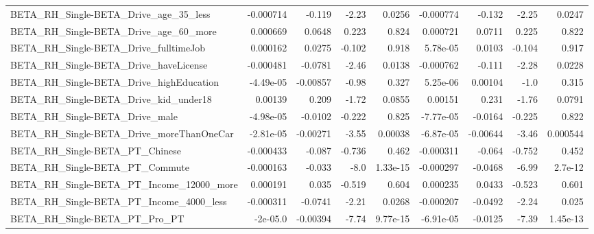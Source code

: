 \begin{tabular}{lrrrrrrrr}
BETA\_RH\_Single-BETA\_Drive\_age\_35\_less              &   -0.000714 &       -0.119 &     -2.23 &   0.0256 &  -0.000774 &      -0.132 &        -2.25 &        0.0247 \\
BETA\_RH\_Single-BETA\_Drive\_age\_60\_more              &    0.000669 &       0.0648 &     0.223 &    0.824 &   0.000721 &      0.0711 &        0.225 &         0.822 \\
BETA\_RH\_Single-BETA\_Drive\_fulltimeJob              &    0.000162 &       0.0275 &    -0.102 &    0.918 &   5.78e-05 &      0.0103 &       -0.104 &         0.917 \\
BETA\_RH\_Single-BETA\_Drive\_haveLicense              &   -0.000481 &      -0.0781 &     -2.46 &   0.0138 &  -0.000762 &      -0.111 &        -2.28 &        0.0228 \\
BETA\_RH\_Single-BETA\_Drive\_highEducation            &   -4.49e-05 &     -0.00857 &     -0.98 &    0.327 &   5.25e-06 &     0.00104 &         -1.0 &         0.315 \\
BETA\_RH\_Single-BETA\_Drive\_kid\_under18              &     0.00139 &        0.209 &     -1.72 &   0.0855 &    0.00151 &       0.231 &        -1.76 &        0.0791 \\
BETA\_RH\_Single-BETA\_Drive\_male                     &   -4.98e-05 &      -0.0102 &    -0.222 &    0.825 &  -7.77e-05 &     -0.0164 &       -0.225 &         0.822 \\
BETA\_RH\_Single-BETA\_Drive\_moreThanOneCar           &   -2.81e-05 &     -0.00271 &     -3.55 &  0.00038 &  -6.87e-05 &    -0.00644 &        -3.46 &      0.000544 \\
BETA\_RH\_Single-BETA\_PT\_Chinese                     &   -0.000433 &       -0.087 &    -0.736 &    0.462 &  -0.000311 &      -0.064 &       -0.752 &         0.452 \\
BETA\_RH\_Single-BETA\_PT\_Commute                     &   -0.000163 &       -0.033 &      -8.0 & 1.33e-15 &  -0.000297 &     -0.0468 &        -6.99 &       2.7e-12 \\
BETA\_RH\_Single-BETA\_PT\_Income\_12000\_more           &    0.000191 &        0.035 &    -0.519 &    0.604 &   0.000235 &      0.0433 &       -0.523 &         0.601 \\
BETA\_RH\_Single-BETA\_PT\_Income\_4000\_less            &   -0.000311 &      -0.0741 &     -2.21 &   0.0268 &  -0.000207 &     -0.0492 &        -2.24 &         0.025 \\
BETA\_RH\_Single-BETA\_PT\_Pro\_PT                      &    -2e-05.0 &     -0.00394 &     -7.74 & 9.77e-15 &  -6.91e-05 &     -0.0125 &        -7.39 &      1.45e-13 \\

\end{tabular}
